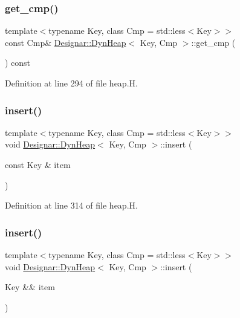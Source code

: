 \subsubsection{\texorpdfstring{get\+\_\+cmp()}{get\_cmp()}\hspace{0.1cm}{\footnotesize\ttfamily [2/2]}}
{\footnotesize\ttfamily template$<$typename Key, class Cmp = std\+::less$<$\+Key$>$$>$ \\
const Cmp\& \hyperlink{class_designar_1_1_dyn_heap}{Designar\+::\+Dyn\+Heap}$<$ Key, Cmp $>$\+::get\+\_\+cmp (\begin{DoxyParamCaption}{ }\end{DoxyParamCaption}) const\hspace{0.3cm}{\ttfamily [inline]}}



Definition at line 294 of file heap.\+H.

\mbox{\label{class_designar_1_1_dyn_heap_aba3a8286ddea8098ab89e18658ec1e3c}} 
\subsubsection{\texorpdfstring{insert()}{insert()}\hspace{0.1cm}{\footnotesize\ttfamily [1/2]}}
{\footnotesize\ttfamily template$<$typename Key, class Cmp = std\+::less$<$\+Key$>$$>$ \\
void \hyperlink{class_designar_1_1_dyn_heap}{Designar\+::\+Dyn\+Heap}$<$ Key, Cmp $>$\+::insert (\begin{DoxyParamCaption}\item[{const Key \&}]{item }\end{DoxyParamCaption})\hspace{0.3cm}{\ttfamily [inline]}}



Definition at line 314 of file heap.\+H.

\mbox{\label{class_designar_1_1_dyn_heap_a28d454d027e576f9fc6f1c888c5e8809}} 
\subsubsection{\texorpdfstring{insert()}{insert()}\hspace{0.1cm}{\footnotesize\ttfamily [2/2]}}
{\footnotesize\ttfamily template$<$typename Key, class Cmp = std\+::less$<$\+Key$>$$>$ \\
void \hyperlink{class_designar_1_1_dyn_heap}{Designar\+::\+Dyn\+Heap}$<$ Key, Cmp $>$\+::insert (\begin{DoxyParamCaption}\item[{Key \&\&}]{item }\end{DoxyParamCaption})\hspace{0.3cm}{\ttfamily [inline]}}



